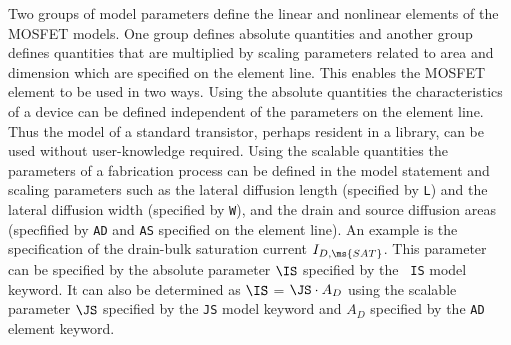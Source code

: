 

%
%
 


Two groups of model parameters define the linear and nonlinear
elements of the MOSFET models. One group defines absolute
quantities and another group defines quantities that are
multiplied by scaling parameters related to area and dimension
which are specified on the element line. This enables the MOSFET
element to be used in two ways.  Using the absolute quantities the
characteristics of a device can be defined independent of the
parameters on the element line. Thus the model of a standard
transistor, perhaps resident in a library, can be used without
user-knowledge required. Using the scalable quantities the
parameters of a fabrication process can be defined in the model
statement and scaling parameters such as the lateral diffusion
length (specified by {\tt L}) and the lateral diffusion width
(specified by {\tt W}), and the drain and source diffusion areas
(specfified by {\tt AD} and {\tt AS} specified on the element
line). An example is the specification of the drain-bulk
saturation current $I_{D,\ms{SAT}}$.  This parameter can be
specified by the absolute parameter $\IS$ specified by the {\tt
IS} model keyword.  It can also be determined as $\IS$ = $\JS\cdot
A_D$ using the scalable parameter $\JS$ specified by the {\tt JS}
model keyword and $A_D$ specified by the {\tt AD} element keyword.

